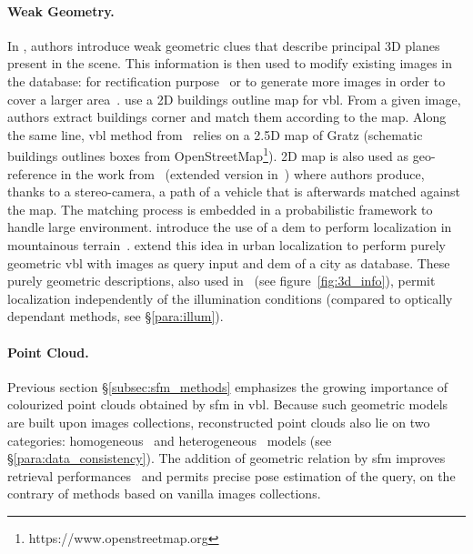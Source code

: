 		\paragraph{Weak Geometry.}
			\label{subsubsec:weak_geometry}			
			In \citep{Torii2015,Chen2011}, authors introduce weak geometric clues that describe principal 3D planes present in the scene. This information is then used to modify existing images in the database: for rectification purpose~\citep{Chen2011} or to generate more images in order to cover a larger area~\citep{Torii2015}. \citet{Cham2010} use a 2D buildings outline map for \ac{vbl}. From a given image, authors extract buildings corner and match them according to the map. Along the same line, \ac{vbl} method from~\citep{Arth2015} relies on a 2.5D map of Gratz (schematic buildings outlines boxes from OpenStreetMap\footnote{https://www.openstreetmap.org}). 2D map is also used as geo-reference in the work from~\citep{Brubaker2013} (extended version in~\citep{Brubaker2016}) where authors produce, thanks to a stereo-camera, a path of a vehicle that is afterwards matched against the map. The matching process is embedded in a probabilistic framework to handle large environment. \citet{Baatz2012} introduce the use of a \ac{dem} to perform localization in mountainous terrain~\citep{Ramalingam2010,Tzeng2013,Chen2015}. \citet{Bansal2014} extend this idea in urban localization to perform purely geometric \ac{vbl} with images as query input and \ac{dem} of a city as database. These purely geometric descriptions, also used in~\citep{Matei2013,Christie2016,Ramalingam2010,Ramalingam2011} (see figure~\ref{fig:3d_info}), permit localization independently of the illumination conditions (compared to optically dependant methods, see \S\ref{para:illum}).

		\paragraph{Point Cloud.}
        \label{subsubsec:3d_geometry}
			Previous section \S\ref{subsec:sfm_methods} emphasizes the growing importance of colourized point clouds obtained by \ac{sfm} in \ac{vbl}. Because such geometric models are built upon images collections, reconstructed point clouds also lie on two categories: homogeneous~\citep{Kendall2015,Kendall2016} and heterogeneous~\citep{Irschara2009,Sattler2011} models (see \S\ref{para:data_consistency}). The addition of geometric relation by \ac{sfm} improves retrieval performances~\citep{Sattler2012a} and permits precise pose estimation of the query, on the contrary of methods based on vanilla images collections.

